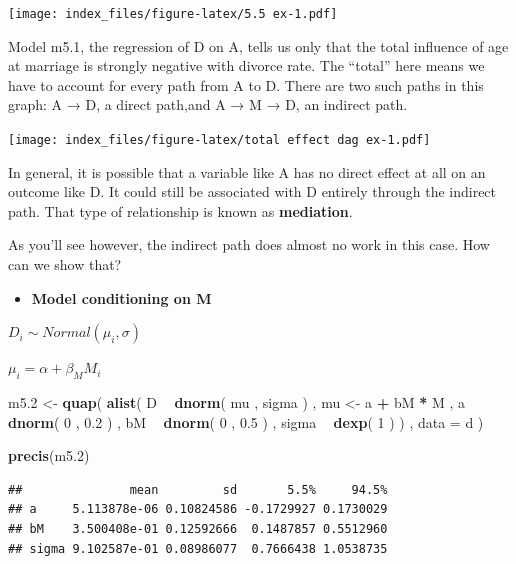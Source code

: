 \documentclass[
]{article}
\newenvironment{Shaded}{\begin{snugshade}}{\end{snugshade}}
\newcommand{\DataTypeTok}[1]{\textcolor[rgb]{0.13,0.29,0.53}{#1}}
\newcommand{\DecValTok}[1]{\textcolor[rgb]{0.00,0.00,0.81}{#1}}
\newcommand{\FloatTok}[1]{\textcolor[rgb]{0.00,0.00,0.81}{#1}}
\newcommand{\KeywordTok}[1]{\textcolor[rgb]{0.13,0.29,0.53}{\textbf{#1}}}
\newcommand{\NormalTok}[1]{#1}
\newcommand{\OperatorTok}[1]{\textcolor[rgb]{0.81,0.36,0.00}{\textbf{#1}}}
\newcommand{\StringTok}[1]{\textcolor[rgb]{0.31,0.60,0.02}{#1}}
\providecommand{\tightlist}{%
  \setlength{\itemsep}{0pt}\setlength{\parskip}{0pt}}
\begin{document}
\texttt{[image: index\_files/figure-latex/5.5 ex-1.pdf]}

Model m5.1, the regression of D on A, tells us only that the total
influence of age at marriage is strongly negative with divorce rate. The
``total'' here means we have to account for every path from A to D.
There are two such paths in this graph: A → D, a direct path,and A → M →
D, an indirect path.

\texttt{[image: index\_files/figure-latex/total effect dag ex-1.pdf]}

In general, it is possible that a variable like A has no direct effect
at all on an outcome like D. It could still be associated with D
entirely through the indirect path. That type of relationship is known
as \textbf{mediation}.

As you'll see however, the indirect path does almost no work in this
case. How can we show that?

\begin{itemize}
\tightlist
\item
  \textbf{Model conditioning on M}
\end{itemize}

\(D_{i} ∼ Normal(\mu_{i}, \sigma)\)

\(\mu_{i} = \alpha + \beta_{M}M_{i}\)

\begin{Shaded}
\begin{Highlighting}[]
\NormalTok{m5}\FloatTok{.2}\NormalTok{ <-}\StringTok{ }\KeywordTok{quap}\NormalTok{(}
    \KeywordTok{alist}\NormalTok{(}
\NormalTok{        D }\OperatorTok{~}\StringTok{ }\KeywordTok{dnorm}\NormalTok{( mu , sigma ) ,}
\NormalTok{        mu <-}\StringTok{ }\NormalTok{a }\OperatorTok{+}\StringTok{ }\NormalTok{bM }\OperatorTok{*}\StringTok{ }\NormalTok{M ,}
\NormalTok{        a }\OperatorTok{~}\StringTok{ }\KeywordTok{dnorm}\NormalTok{( }\DecValTok{0}\NormalTok{ , }\FloatTok{0.2}\NormalTok{ ) ,}
\NormalTok{        bM }\OperatorTok{~}\StringTok{ }\KeywordTok{dnorm}\NormalTok{( }\DecValTok{0}\NormalTok{ , }\FloatTok{0.5}\NormalTok{ ) ,}
\NormalTok{        sigma }\OperatorTok{~}\StringTok{ }\KeywordTok{dexp}\NormalTok{( }\DecValTok{1}\NormalTok{ )}
\NormalTok{) , }\DataTypeTok{data =}\NormalTok{ d )}

\KeywordTok{precis}\NormalTok{(m5}\FloatTok{.2}\NormalTok{)}
\end{Highlighting}
\end{Shaded}

\begin{verbatim}
##               mean         sd       5.5%     94.5%
## a     5.113878e-06 0.10824586 -0.1729927 0.1730029
## bM    3.500408e-01 0.12592666  0.1487857 0.5512960
## sigma 9.102587e-01 0.08986077  0.7666438 1.0538735
\end{verbatim}
\end{document}
